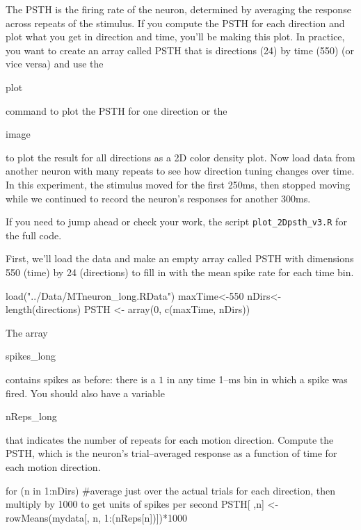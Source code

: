 \documentclass[
letterpaper, %
11pt, %
 oneside, 
onecolumn, %
]{memoir}
\numberwithin{Exercise}{chapter}
\begin{document}
The PSTH is the firing rate of the neuron, determined by averaging the response across repeats of the stimulus.  If you compute the PSTH for each direction and plot what you get in direction and time, you'll be making this plot.  In practice, you want to create an array called PSTH that is directions (24) by time (550) (or vice versa) and use the 
\begin{ttfamily}plot\end{ttfamily} command to plot the PSTH for one direction or the 
\begin{ttfamily}image\end{ttfamily} to plot the result for all directions as a 2D color density plot. 
Now load data from another neuron with many repeats to see how direction tuning changes over time.
In this experiment, the stimulus moved for the first 250ms, then stopped moving while we continued to record the neuron's responses for another 300ms. 

If you need to jump ahead or check your work, the script \verb+plot_2Dpsth_v3.R+ for the full code.

First, we'll load the data and make an empty array called PSTH with dimensions 
550 (time) by 24 (directions) to fill in with the mean spike rate for each time bin.

 \begin{shortrcode}
load("../Data/MTneuron_long.RData")
maxTime<-550
nDirs<-length(directions)
PSTH <- array(0, c(maxTime, nDirs))

\end{shortrcode}

The array \begin{ttfamily}spikes\_long\end{ttfamily} contains spikes as before: there is a $1$ in any time 1--ms bin  in which a spike was fired.  You should also have a variable \begin{ttfamily}nReps\_long\end{ttfamily} that indicates the number of repeats for each motion direction. Compute the PSTH, which is the neuron's trial--averaged response as a function of time for each motion direction. 

\begin{shortrcode}

 for (n in 1:nDirs){
#average just over the actual trials for each direction, then multiply by 1000 to get units of spikes per second
PSTH[ ,n] <- rowMeans(mydata[, n, 1:(nReps[n])])*1000 
 }  
\end{shortrcode}
\end{document}
